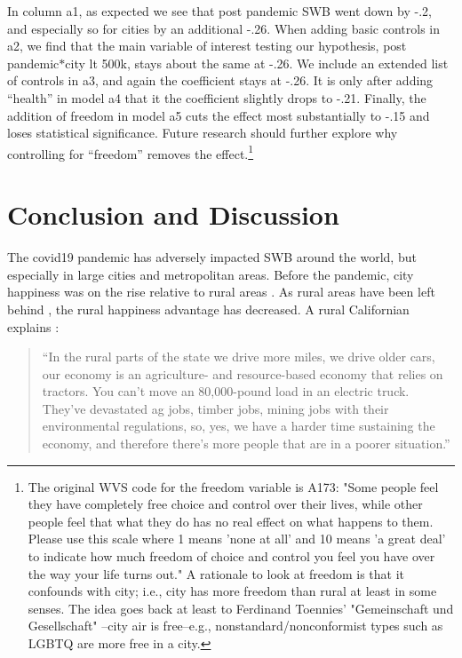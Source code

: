 \documentclass[10pt, letterpaper]{article}
\begin{document}
\begin{spacing}{1.4}
In column a1, as expected we see that post pandemic SWB went down by -.2, and
especially so for cities by an additional -.26. When adding basic controls in
a2, we find that the main variable of interest testing our hypothesis, post
pandemic$*$city lt 500k, stays about the same at -.26. We include an extended
list of controls in a3, and again  the  coefficient stays at -.26. It is only
after adding ``health'' in model a4 that it the coefficient slightly drops to
-.21. Finally,  the addition of freedom in model a5 cuts the effect most
substantially to -.15 and loses statistical significance. Future research should
further explore why controlling for ``freedom'' removes the effect.\footnote{The
  original WVS code for the freedom variable is A173: "Some people feel they
  have completely free choice and control over their lives, while other people
  feel that what they do has no real effect on what happens to them. Please use
  this scale where 1 means 'none at all' and 10 means 'a great deal' to indicate
  how much freedom of choice and control you feel you have over the way your
  life turns out." A rationale to look at freedom is that it confounds with
  city; i.e., city has more freedom than rural at least in some senses. The idea
  goes back at least to Ferdinand Toennies' "Gemeinschaft und Gesellschaft" \citep{tonnies57}--city air is free--e.g., nonstandard/nonconformist types such as LGBTQ are more free in a city.}



\section{Conclusion and Discussion}

The covid19 pandemic has adversely impacted SWB around the world, but especially
in large cities and metropolitan areas. Before the pandemic, city happiness was
on the rise relative to rural areas \citep{millennials}. As rural areas have
been left behind \citep{hansonCityJournalautumn15}, the rural happiness
advantage has decreased. A rural Californian explains \citep[][p. 2]{fullerNYT17monD}:

\begin{quote}``In the rural parts of the state we drive more miles, we drive older cars, our economy is an agriculture- and resource-based economy that relies on tractors. You can't move an 80,000-pound load in an electric truck. They've devastated ag jobs, timber jobs, mining jobs with their environmental regulations, so, yes, we have a harder time sustaining the economy, and therefore there's more people that are in a poorer situation.''
\end{quote}


\end{spacing}
\end{document}
